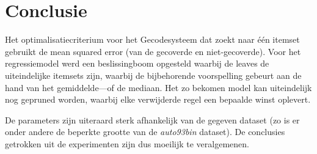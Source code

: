 \documentclass[a4paper,dutch,11pt,]{article}
\begin{document}

\section{Conclusie}
Het optimalisatiecriterium voor het Gecodesysteem dat zoekt naar één itemset gebruikt de mean squared error (van de gecoverde en niet-gecoverde).
Voor het regressiemodel werd een beslissingboom opgesteld waarbij de leaves de uiteindelijke itemsets zijn, waarbij de bijbehorende voorspelling gebeurt aan de hand van het gemiddelde---of de mediaan. Het zo bekomen model kan uiteindelijk nog gepruned worden, waarbij elke verwijderde regel een bepaalde winst oplevert. 

De parameters zijn uiteraard sterk afhankelijk van de gegeven dataset (zo is er onder andere de beperkte grootte van de \emph{auto93bin} dataset). De conclusies getrokken uit de experimenten zijn dus moeilijk te veralgemenen.




%
\end{document}
